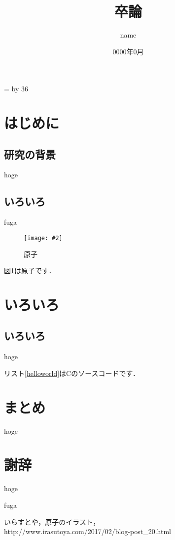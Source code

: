 \documentclass[10pt,a4paper]{jsarticle}
\title{卒論} %
\date{0000年0月} %
\author{name} %
\def\linesparpage#1{
    \baselineskip=\textheight
    \divide\baselineskip by #1
}
\newcommand{\figuref}[1]{図\ref{#1}}
\newcommand{\fig}[4][width=\textwidth]{
    \begin{figure}[!h]
    \begin{center}
    \texttt{[image: \#2]}
    \caption{#3}
    \label{#4}
    \end{center}
    \end{figure}
}
\newcommand{\lstref}[1]{リスト\ref{#1}}
\begin{document}
\linesparpage{36} %

\begin{titlepage}
\maketitle
\thispagestyle{empty}
\end{titlepage}

\tableofcontents
\thispagestyle{empty}
\newpage

\setcounter{page}{1}
\pagestyle{plain}

\section{はじめに}

\subsection{研究の背景}
hoge\cite{hoge}

\subsection{いろいろ}
fuga

\fig{image/atom.jpg}{原子}{atom}

\figuref{atom}は原子です\cite{irasutoya}．

\section{いろいろ}

\subsection{いろいろ}
hoge

\lstref{helloworld}はCのソースコードです．

\section{まとめ}
hoge

\section*{謝辞} %
hoge

\begin{flushleft} %
\begin{thebibliography}{9} %

fuga %

いらすとや，原子のイラスト，
\\ %
http://www.irasutoya.com/2017/02/blog-post\_20.html %

\end{thebibliography}
\end{flushleft}
\end{document}
